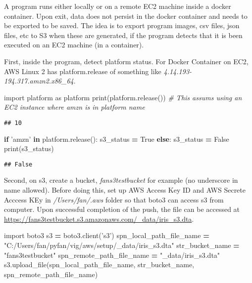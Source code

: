 \documentclass[
]{book}
\newenvironment{Shaded}{\begin{snugshade}}{\end{snugshade}}
\newcommand{\BuiltInTok}[1]{#1}
\newcommand{\CommentTok}[1]{\textcolor[rgb]{0.56,0.35,0.01}{\textit{#1}}}
\newcommand{\ControlFlowTok}[1]{\textcolor[rgb]{0.13,0.29,0.53}{\textbf{#1}}}
\newcommand{\ImportTok}[1]{#1}
\newcommand{\KeywordTok}[1]{\textcolor[rgb]{0.13,0.29,0.53}{\textbf{#1}}}
\newcommand{\NormalTok}[1]{#1}
\newcommand{\OperatorTok}[1]{\textcolor[rgb]{0.81,0.36,0.00}{\textbf{#1}}}
\newcommand{\StringTok}[1]{\textcolor[rgb]{0.31,0.60,0.02}{#1}}
\newcommand{\VariableTok}[1]{\textcolor[rgb]{0.00,0.00,0.00}{#1}}
\begin{document}
A program runs either locally or on a remote EC2 machine inside a docker container. Upon exit, data does not persist in the docker container and needs to be exported to be saved. The idea is to export program images, csv files, json files, etc to S3 when these are generated, if the program detects that it is been executed on an EC2 machine (in a container).

First, inside the program, detect platform status. For Docker Container on EC2, AWS Linux 2 has platform.release of something like \emph{4.14.193-194.317.amzn2.x86\_64}.

\begin{Shaded}
\begin{Highlighting}[]
\ImportTok{import}\NormalTok{ platform }\ImportTok{as}\NormalTok{ platform}
\BuiltInTok{print}\NormalTok{(platform.release())}
\CommentTok{# This assums using an EC2 instance where amzn is in platform name}
\end{Highlighting}
\end{Shaded}

\begin{verbatim}
## 10
\end{verbatim}

\begin{Shaded}
\begin{Highlighting}[]
\ControlFlowTok{if} \StringTok{'amzn'} \KeywordTok{in}\NormalTok{ platform.release():}
\NormalTok{    s3_status }\OperatorTok{=} \VariableTok{True}
\ControlFlowTok{else}\NormalTok{:}
\NormalTok{    s3_status }\OperatorTok{=} \VariableTok{False}
\BuiltInTok{print}\NormalTok{(s3_status)}
\end{Highlighting}
\end{Shaded}

\begin{verbatim}
## False
\end{verbatim}

Second, on s3, create a bucket, \emph{fans3testbucket} for example (no underscore in name allowed). Before doing this, set up AWS Access Key ID and AWS Secrete Acccess KEy in \emph{/Users/fan/.aws} folder so that boto3 can access s3 from computer. Upon successful completion of the push, the file can be accessed at \url{https://fans3testbucket.s3.amazonaws.com/_data/iris_s3.dta}.

\begin{Shaded}
\begin{Highlighting}[]
\ImportTok{import}\NormalTok{ boto3}
\NormalTok{s3 }\OperatorTok{=}\NormalTok{ boto3.client(}\StringTok{'s3'}\NormalTok{)}
\NormalTok{spn_local_path_file_name }\OperatorTok{=} \StringTok{"C:/Users/fan/pyfan/vig/aws/setup/_data/iris_s3.dta"}
\NormalTok{str_bucket_name }\OperatorTok{=} \StringTok{"fans3testbucket"}
\NormalTok{spn_remote_path_file_name }\OperatorTok{=} \StringTok{"_data/iris_s3.dta"}
\NormalTok{s3.upload_file(spn_local_path_file_name, str_bucket_name, spn_remote_path_file_name)}
\end{Highlighting}
\end{Shaded}
\end{document}
